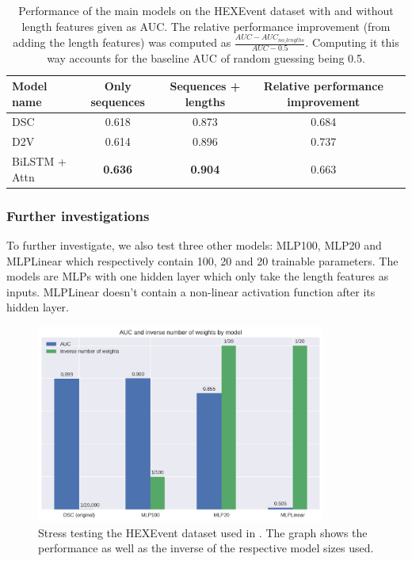 \begin{table}[h!]
	\centering
	\begin{tabular}{| l | c | c | c| c} 
		\hline
		Model name & Only sequences & Sequences + lengths & Relative performance improvement\\
		\hline
		DSC & 0.618 & 0.873 & 0.684\\
		D2V & 0.614 & 0.896 & 0.737\\
		BiLSTM + Attn & \textbf{0.636} & \textbf{0.904} & 0.663\\
		\hline
	\end{tabular}
	\caption{Performance of the main models on the HEXEvent dataset with and without length features given as AUC. The relative performance improvement (from adding the length features) was computed as $\frac{AUC - AUC_{no\_lengths}}{AUC - 0.5}$. Computing it this way accounts for the baseline AUC of random guessing being 0.5.
	}
	\label{table:results_hexevent}
\end{table}

\subsubsection{Further investigations}
To further investigate, we also test three other models: MLP100, MLP20 and MLPLinear which respectively contain 100, 20 and 20 trainable parameters. The models are MLPs with one hidden layer which only take the length features as inputs. MLPLinear doesn't contain a non-linear activation function after its hidden layer.

\begin{figure}
	\centering\includegraphics[width=0.85\textwidth]{../visualizations/ch5-results/dsc_funeral_barchart.png} 
	\caption{Stress testing the HEXEvent dataset used in \cite{dsc}. The graph shows the performance as well as the inverse of the respective model sizes used.}
	\label{fig:dsc_funeral}
\end{figure}

